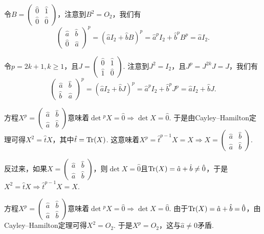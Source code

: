 \begin{solution}
  \begin{inparaenum}[(a)]
    \item 令$B=\begin{pmatrix}
      \hat 0 & \hat 1 \\
      \hat 0 & \hat 0
    \end{pmatrix}$，注意到$B^2=O_2$，我们有
    \[
      \begin{pmatrix}
        \hat a & \hat b \\
        \hat 0 & \hat a
      \end{pmatrix}^p = (\hat aI_2 + \hat b B)^p
      = \hat a^pI_2 + \hat b^pB^p = \hat aI_2.
    \]

    \item 令$p=2k+1,k\ge1$，且$J=\begin{pmatrix}
      \hat 0 & \hat 1 \\
      \hat 1 & \hat 0
    \end{pmatrix}$. 注意到$J^2=I_2$，且$J^p=J^{2k}J=J$，我们有
    \[
      \begin{pmatrix}
        \hat a & \hat b \\
        \hat b & \hat a
      \end{pmatrix}^p = (\hat aI_2 + \hat bJ )^p = \hat a^pI_2 + \hat b^pJ^p = \hat aI_2 + \hat bJ.
    \]

    \item 方程$X^p=\begin{pmatrix}
      \hat a & \hat b \\
      \hat a & \hat b
    \end{pmatrix}$意味着$\det{}^pX=\hat 0\Rightarrow \det X=\hat 0$. 于是由Cayley--Hamilton定理可得$X^2=\hat tX$，其中$\hat t =\operatorname{Tr}(X)$. 这意味着$X^p=\hat t^{p-1}X=X\Rightarrow X=\begin{pmatrix}
      \hat a & \hat b \\
      \hat a & \hat b
    \end{pmatrix}$.

    反过来，如果$X=\begin{pmatrix}
      \hat a & \hat b \\
      \hat a & \hat b
    \end{pmatrix}$，则$\det X=\hat0$且$\operatorname{Tr}(X)=\hat a+\hat b\ne\hat0$，于是$X^2=\hat tX\Rightarrow\hat t^{p-1}X=X$.

    \item 方程$X^p=\begin{pmatrix}
      \hat a & \hat b \\
      \hat a & \hat b
    \end{pmatrix}$意味着$\det{}^pX=\hat0\Rightarrow \det X=\hat0$. 由于$\operatorname{Tr}(X)=\hat a+\hat b=\hat0$，由Cayley--Hamilton定理可得$X^2=O_2$. 于是$X^p=O_2$，这与$\hat a\ne0$矛盾.


\end{inparaenum}
\end{solution}
